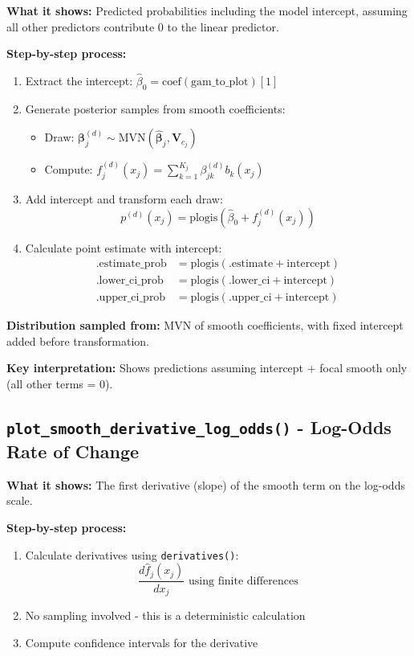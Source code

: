 \documentclass[11pt, a4paper]{article}
\begin{document}
\textbf{What it shows:} Predicted probabilities including the model intercept, assuming all other predictors contribute 0 to the linear predictor.

\textbf{Step-by-step process:}
\begin{enumerate}
   \item Extract the intercept: $\hat{\beta}_0 = \text{coef}(\text{gam\_to\_plot})[1]$
   \item Generate posterior samples from smooth coefficients:
   \begin{itemize}
       \item Draw: $\boldsymbol{\beta}_j^{(d)} \sim \text{MVN}(\hat{\boldsymbol{\beta}}_j, \mathbf{V}_{c_j})$
       \item Compute: $f_j^{(d)}(x_j) = \sum_{k=1}^{K_j} \beta_{jk}^{(d)} b_k(x_j)$
   \end{itemize}
   \item Add intercept and transform each draw:
   $$p^{(d)}(x_j) = \text{plogis}(\hat{\beta}_0 + f_j^{(d)}(x_j))$$
   \item Calculate point estimate with intercept:
   \begin{align}
   \text{.estimate\_prob} &= \text{plogis}(\text{.estimate} + \text{intercept}) \\
   \text{.lower\_ci\_prob} &= \text{plogis}(\text{.lower\_ci} + \text{intercept}) \\
   \text{.upper\_ci\_prob} &= \text{plogis}(\text{.upper\_ci} + \text{intercept})
   \end{align}
\end{enumerate}

\textbf{Distribution sampled from:} MVN of smooth coefficients, with fixed intercept added before transformation.

\textbf{Key interpretation:} Shows predictions assuming intercept + focal smooth only (all other terms = 0).

\subsection*{\texttt{plot\_smooth\_derivative\_log\_odds()} - Log-Odds Rate of Change}

\textbf{What it shows:} The first derivative (slope) of the smooth term on the log-odds scale.

\textbf{Step-by-step process:}
\begin{enumerate}
   \item Calculate derivatives using \texttt{derivatives()}:
   $$\frac{d\hat{f}_j(x_j)}{dx_j} \text{ using finite differences}$$
   \item No sampling involved - this is a deterministic calculation
   \item Compute confidence intervals for the derivative
\end{enumerate}
\end{document}
